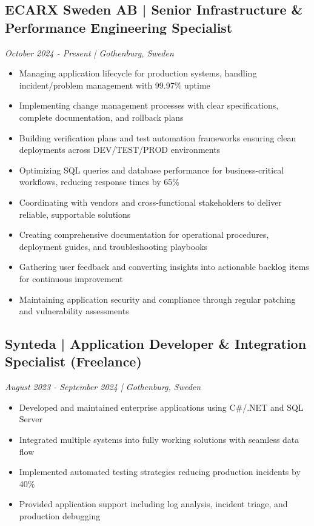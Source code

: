 \documentclass[11pt,a4paper]{article}
\begin{document}
\subsection*{ECARX Sweden AB | Senior Infrastructure \& Performance Engineering Specialist}
\textit{October 2024 - Present | Gothenburg, Sweden}
\begin{itemize}[noitemsep]
\item Managing application lifecycle for production systems, handling incident/problem management with 99.97\% uptime
\item Implementing change management processes with clear specifications, complete documentation, and rollback plans
\item Building verification plans and test automation frameworks ensuring clean deployments across DEV/TEST/PROD environments
\item Optimizing SQL queries and database performance for business-critical workflows, reducing response times by 65\%
\item Coordinating with vendors and cross-functional stakeholders to deliver reliable, supportable solutions
\item Creating comprehensive documentation for operational procedures, deployment guides, and troubleshooting playbooks
\item Gathering user feedback and converting insights into actionable backlog items for continuous improvement
\item Maintaining application security and compliance through regular patching and vulnerability assessments
\end{itemize}

\subsection*{Synteda | Application Developer \& Integration Specialist (Freelance)}
\textit{August 2023 - September 2024 | Gothenburg, Sweden}
\begin{itemize}[noitemsep]
\item Developed and maintained enterprise applications using C\#/.NET and SQL Server
\item Integrated multiple systems into fully working solutions with seamless data flow
\item Implemented automated testing strategies reducing production incidents by 40\%
\item Provided application support including log analysis, incident triage, and production debugging
\end{itemize}
\end{document}
